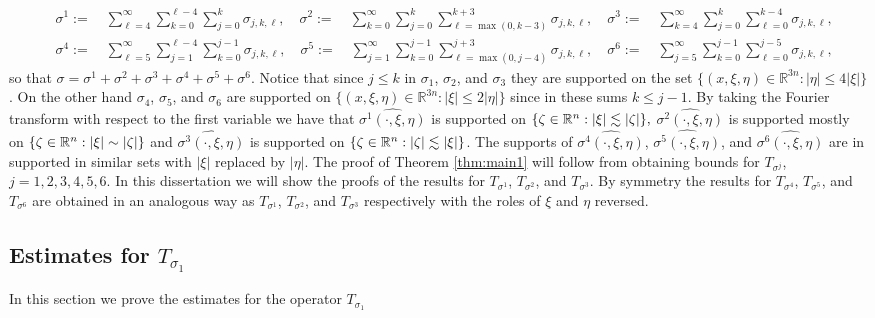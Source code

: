 \begin{align*}
& \sigma^1:= \quad \sum\limits_{\ell=4}^\infty \sum\limits_{k=0}^{\ell - 4} \sum\limits_{j =0}^{k} \sigma_{j,k,\ell}, \quad \sigma^2:= \quad \sum\limits_{k=0}^\infty \sum\limits_{j=0}^k \sum\limits_{\ell =\max(0,k-3)}^{k+3} \sigma_{j,k,\ell},\quad\sigma^3:= \quad \sum\limits_{k=4}^\infty \sum\limits_{j=0}^k \sum\limits_{\ell =0}^{k-4} \sigma_{j,k,\ell},\\
&\sigma^4:= \quad \sum\limits_{\ell=5}^\infty \sum\limits_{j=1}^{\ell - 4} \sum\limits_{k =0}^{j-1} \sigma_{j,k,\ell}, \quad \sigma^5:= \quad  \sum\limits_{j=1}^\infty \sum\limits_{k=0}^{j-1} \sum\limits_{\ell =\max(0,j-4)}^{j+3} \sigma_{j,k,\ell},\quad \sigma^6:= \quad \sum\limits_{j=5}^\infty \sum\limits_{k=0}^{j-1} \sum\limits_{\ell =0}^{j-5} \sigma_{j,k,\ell},
\end{align*}
so that $\sigma = \sigma^1+\sigma^2+\sigma^3+\sigma^4+\sigma^5+\sigma^6.$ Notice that since $j\leq k$ in $\sigma_1$, $\sigma_2$, and $\sigma_3$ they are supported on the set $\{(x,\xi,\eta) \in \mathbb{R}^{3n} : |\eta| \leq 4|\xi|\}$. On the other hand $\sigma_4$, $\sigma_5$, and $\sigma_6$ are supported on $\{(x,\xi,\eta) \in \mathbb{R}^{3n} : |\xi| \leq 2|\eta|\}$ since in these sums $k \leq j-1$. By taking the Fourier transform with respect to the first variable we have that $\widehat{\sigma^1(\cdot,\xi,\eta)}$ is supported on $\{\zeta\in{{\mathbb R}^n}: \left\vert \xi \right\vert\lesssim \left\vert \zeta \right\vert\},$
$\widehat{\sigma^2(\cdot,\xi,\eta)}$ is supported mostly on $\{\zeta\in{{\mathbb R}^n}: \left\vert \xi \right\vert\sim \left\vert \zeta \right\vert\}$ and $\widehat{\sigma^3(\cdot,\xi,\eta)}$ is supported on $\{\zeta\in{{\mathbb R}^n}: \left\vert \zeta \right\vert\lesssim \left\vert \xi \right\vert\}$. The supports of $\widehat{\sigma^4(\cdot,\xi,\eta)}$, $\widehat{\sigma^5(\cdot,\xi,\eta)}$, and $\widehat{\sigma^6(\cdot,\xi,\eta)}$ are in supported in similar sets with $|\xi|$ replaced by $|\eta|$. The proof of Theorem \ref{thm:main1} will follow from obtaining bounds for $T_{\sigma^j}$, $j=1,2,3,4,5,6$. In this dissertation we will show the proofs of the results for $T_{\sigma^1}$, $T_{\sigma^2}$, and $T_{\sigma^3}$. By symmetry the results for $T_{\sigma^4}$, $T_{\sigma^5}$, and $T_{\sigma^6}$ are obtained in an analogous way as $T_{\sigma^1}$, $T_{\sigma^2}$, and $T_{\sigma^3}$ respectively with the roles of $\xi$ and $\eta$ reversed.
\subsection{Estimates for $T_{\sigma_1}$}
In this section we prove the estimates for the operator $T_{\sigma_1}$

